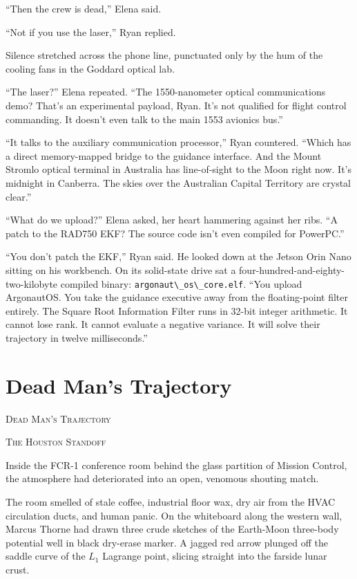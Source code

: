 \documentclass[12pt,twoside,openright]{book}
\newcommand{\sceneheader}[1]{%
  \par\vspace{1.8em}%
  {\noindent\centering\scshape\large #1\par}%
  \vspace{1.0em}%
  \noindent%
}
\begin{document}
``Then the crew is dead,'' Elena said.

``Not if you use the laser,'' Ryan replied.

Silence stretched across the phone line, punctuated only by the hum of
the cooling fans in the Goddard optical lab.

``The laser?'' Elena repeated. ``The 1550-nanometer optical
communications demo? That's an experimental payload, Ryan. It's not
qualified for flight control commanding. It doesn't even talk to the
main 1553 avionics bus.''

``It talks to the auxiliary communication processor,'' Ryan countered.
``Which has a direct memory-mapped bridge to the guidance interface. And
the Mount Stromlo optical terminal in Australia has line-of-sight to the
Moon right now. It's midnight in Canberra. The skies over the Australian
Capital Territory are crystal clear.''

``What do we upload?'' Elena asked, her heart hammering against her
ribs. ``A patch to the RAD750 EKF? The source code isn't even compiled
for PowerPC.''

``You don't patch the EKF,'' Ryan said. He looked down at the Jetson
Orin Nano sitting on his workbench. On its solid-state drive sat a
four-hundred-and-eighty-two-kilobyte compiled binary:
\passthrough{\lstinline!argonaut\_os\_core.elf!}. ``You upload
ArgonautOS. You take the guidance executive away from the floating-point
filter entirely. The Square Root Information Filter runs in 32-bit
integer arithmetic. It cannot lose rank. It cannot evaluate a negative
variance. It will solve their trajectory in twelve milliseconds.''

\chapter{Dead Man's Trajectory}
\sceneheader{Dead Man's Trajectory}

\sceneheader{The Houston Standoff}

Inside the FCR-1 conference room behind the glass partition of Mission
Control, the atmosphere had deteriorated into an open, venomous shouting
match.

The room smelled of stale coffee, industrial floor wax, dry air from the
HVAC circulation ducts, and human panic. On the whiteboard along the
western wall, Marcus Thorne had drawn three crude sketches of the
Earth-Moon three-body potential well in black dry-erase marker. A jagged
red arrow plunged off the saddle curve of the \(L_1\) Lagrange point,
slicing straight into the farside lunar crust.
\end{document}
